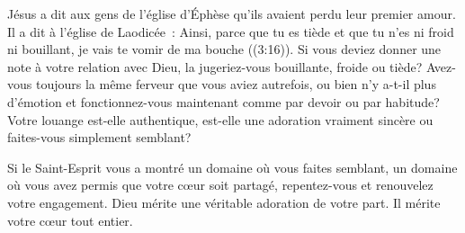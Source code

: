 
Jésus a dit aux gens de l'église d'Éphèse qu'ils avaient perdu
 leur premier amour. Il a dit à l'église de Laodicée~: 
 \og Ainsi, parce que tu es tiède et que tu n'es ni froid ni bouillant,
 je vais te vomir de ma bouche \fg{} 
 ((3:16)).
 Si vous deviez donner une note à votre relation avec Dieu,
 la jugeriez-vous bouillante, froide ou tiède?
 Avez-vous toujours la même ferveur que vous aviez autrefois,
 ou bien n'y a-t-il plus d'émotion et fonctionnez-vous maintenant
 comme par devoir ou par habitude? Votre louange est-elle authentique,
 est-elle une adoration vraiment sincère ou faites-vous simplement semblant? 

Si le Saint-Esprit vous a montré un domaine où vous faites semblant,
 un domaine où vous avez permis que votre cœur soit partagé,
 repentez-vous et renouvelez votre engagement. Dieu mérite une véritable
 adoration de votre part. Il mérite votre cœur tout entier. 

\dvrule







